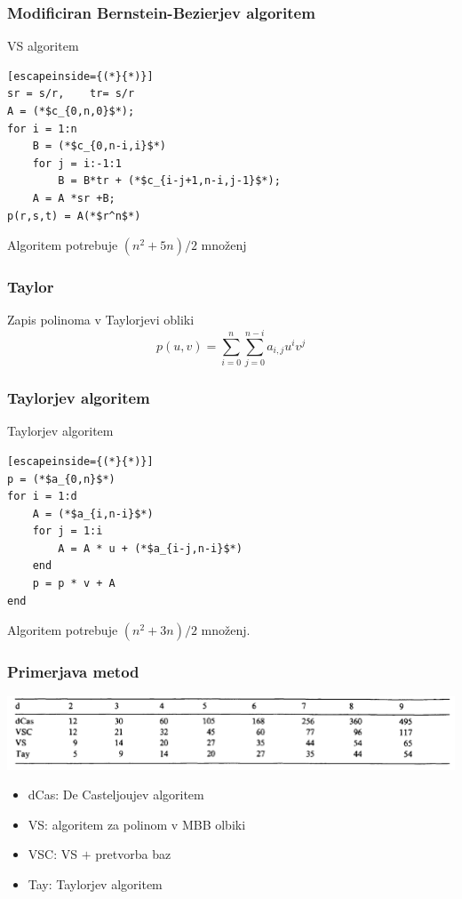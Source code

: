 \documentclass{beamer}
\begin{document}
\begin{frame}[fragile]
\frametitle{Modificiran Bernstein-Bezierjev algoritem}
\begin{block}{VS algoritem}
\begin{lstlisting}[escapeinside={(*}{*)}]
sr = s/r,	 tr= s/r
A = (*$c_{0,n,0}$*);
for i = 1:n
    B = (*$c_{0,n-i,i}$*)
    for j = i:-1:1
        B = B*tr + (*$c_{i-j+1,n-i,j-1}$*);
    A = A *sr +B;
p(r,s,t) = A(*$r^n$*)
\end{lstlisting}
\end{block}
Algoritem potrebuje $(n^2+5n)/2$ množenj


\end{frame}

\begin{frame}
\frametitle{Taylor}
Zapis polinoma v Taylorjevi obliki
$$p(u,v) = \sum_{i = 0}^n{\sum_{j=0}^{n-i}{a_{i,j}u^iv^j }}$$
\end{frame}



\begin{frame}[fragile]
\frametitle{Taylorjev algoritem}

\begin{block}{Taylorjev algoritem}
\begin{lstlisting}[escapeinside={(*}{*)}]
p = (*$a_{0,n}$*)
for i = 1:d
    A = (*$a_{i,n-i}$*)
    for j = 1:i
        A = A * u + (*$a_{i-j,n-i}$*)
    end
    p = p * v + A
end
\end{lstlisting}
\end{block}
Algoritem potrebuje $(n^2+3n)/2$ množenj.

\end{frame}

\begin{frame}
\frametitle{Primerjava metod}

\begin{center}
\includegraphics[width=1.0\linewidth]{tabelca.PNG}
\end{center}

\begin{itemize}
\item dCas: De Casteljoujev algoritem
\item VS: algoritem za polinom v MBB olbiki
\item VSC: VS $+$ pretvorba baz
\item Tay: Taylorjev algoritem
\end{itemize}


\end{frame}
\end{document}

